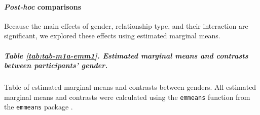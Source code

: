 \documentclass[
  bookmarksnumbered]{article}
\begin{document}
\begin{table}[H]
\centering
\caption{\label{tab:tab-m1a}Effects of relationship type and gender on Solitary TSD}
\centering
{}
\end{table}

\paragraph{\texorpdfstring{\emph{Post-hoc} comparisons}{Post-hoc comparisons}}\label{post-hoc-comparisons}

Because the main effects of gender, relationship type, and their interaction are significant, we explored these effects using estimated marginal means.

\subparagraph{Table \ref{tab:tab-m1a-emm1}. Estimated marginal means and contrasts between participants' gender.}\label{table-reftabtab-m1a-emm1.-estimated-marginal-means-and-contrasts-between-participants-gender.}

Table of estimated marginal means and contrasts between genders. All estimated marginal means and contrasts were calculated using the \texttt{emmeans} function from the \texttt{emmeans} package \autocite{emmeanscit}.
\end{document}
